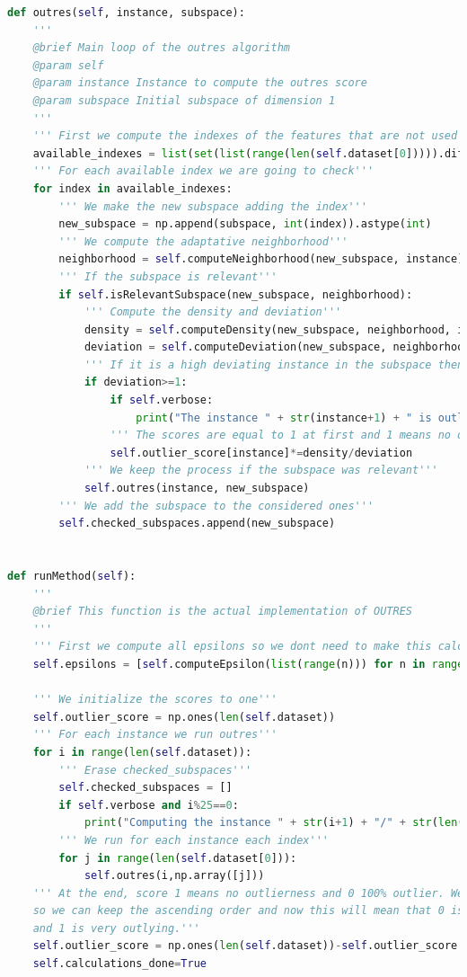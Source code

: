\begin{lstlisting}[language=Python]
def outres(self, instance, subspace):
	'''
	@brief Main loop of the outres algorithm
	@param self
	@param instance Instance to compute the outres score
	@param subspace Initial subspace of dimension 1
	'''
	''' First we compute the indexes of the features that are not used in the actual subspace'''
	available_indexes = list(set(list(range(len(self.dataset[0])))).difference(set(list(subspace))))
	''' For each available index we are going to check'''
	for index in available_indexes:
		''' We make the new subspace adding the index'''
		new_subspace = np.append(subspace, int(index)).astype(int)
		''' We compute the adaptative neighborhood'''
		neighborhood = self.computeNeighborhood(new_subspace, instance)
		''' If the subspace is relevant'''
		if self.isRelevantSubspace(new_subspace, neighborhood):
			''' Compute the density and deviation'''
			density = self.computeDensity(new_subspace, neighborhood, instance)
			deviation = self.computeDeviation(new_subspace, neighborhood, instance, density)
			''' If it is a high deviating instance in the subspace then we update the score'''
			if deviation>=1:
				if self.verbose:
					print("The instance " + str(instance+1) + " is outlying in the subspace " + str(new_subspace))
				''' The scores are equal to 1 at first and 1 means no outlierness and 0 means very outlying'''
				self.outlier_score[instance]*=density/deviation
			''' We keep the process if the subspace was relevant'''
			self.outres(instance, new_subspace)
		''' We add the subspace to the considered ones'''
		self.checked_subspaces.append(new_subspace)


def runMethod(self):
	'''
	@brief This function is the actual implementation of OUTRES
	'''
	''' First we compute all epsilons so we dont need to make this calculation more than once'''
	self.epsilons = [self.computeEpsilon(list(range(n))) for n in range(len(self.dataset[0])+1)]
	
	''' We initialize the scores to one'''
	self.outlier_score = np.ones(len(self.dataset))
	''' For each instance we run outres'''
	for i in range(len(self.dataset)):
		''' Erase checked_subspaces'''
		self.checked_subspaces = []
		if self.verbose and i%25==0:
			print("Computing the instance " + str(i+1) + "/" + str(len(self.dataset)))
		''' We run for each instance each index'''
		for j in range(len(self.dataset[0])):
			self.outres(i,np.array([j]))
	''' At the end, score 1 means no outlierness and 0 100% outlier. We make 1-score
	so we can keep the ascending order and now this will mean that 0 is no outlierness
	and 1 is very outlying.'''
	self.outlier_score = np.ones(len(self.dataset))-self.outlier_score
	self.calculations_done=True
\end{lstlisting}


